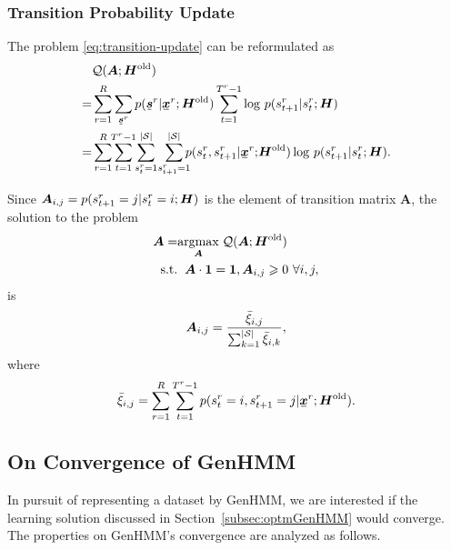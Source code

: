 \subsubsection{Transition Probability Update}
The problem \eqref{eq:transition-update} can be reformulated as
\begin{align}
  &\Qq(\bm{A}; \bm{H}^{\mathrm{old}})\nonumber \\
  =& \sum_{r=1}^{R} \sum_{\ubmr{s}{r}}{p(\ubmr{s}{r}| \ubmr{x}{r}; \bm{H}^{\mathrm{old}})} \sum_{t=1}^{T^{r}-1}\log\,p(\smtr{s}{t+1}{r}|\smtr{s}{t}{r}; \bm{H}) \nonumber \\
  =& \sum_{r=1}^{R} \hspace{-0.1cm}\sum_{t=1}^{T^{r}-1}\hspace{-0.1cm} \sum_{\smtr{s}{t}{r}=1}^{|\Ss|}\hspace{-0.05cm}\sum_{\smtr{s}{t+1}{r}=1}^{|\Ss|}\hspace{-0.2cm}{p(\smtr{s}{t}{r}, \smtr{s}{t+1}{r}| \ubmr{x}{r};\hspace{-0.05cm} \bm{H}^{\mathrm{old}})} \log\,p(\smtr{s}{t+1}{r}|\smtr{s}{t}{r}; \bm{H}).
\end{align}

Since $\bm{A}_{i, j}  = p(\smtr{s}{t+1}{r}=j|\smtr{s}{t}{r}=i; \bm{H})$ is the element of transition matrix $\bm{A}$, the solution to the problem
\begin{align}\label{eq:update-transition-prob}
  \bm{A} = &\uargmax{\bm{A}} \Qq(\bm{A}; \bm{H}^{\mathrm{old}}) \nonumber \\
  \mathrm{s.t.} &\hspace{0.2cm} \bm{A} \cdot \bm{1} = \bm{1}, \bm{A}_{i,j} \geq 0 \,\, \forall i,j,
\end{align}
is
\begin{equation}
  \bm{A}_{i,j} = \frac{\bar{\xi}_{i,j}}{\sum_{k = 1}^{|\Ss|} \bar{\xi}_{i,k}},
\end{equation}
where
\begin{equation}\label{eq:update-transition-solt}
  \bar{\xi}_{i,j} = \sum_{r= 1}^{R} \sum_{t= 1}^{T^{r}-1}{p(\smtr{s}{t}{r}=i, \smtr{s}{t+1}{r}=j| \ubmr{x}{r}; \bm{H}^{\mathrm{old}})}.
\end{equation}
\subsection{On Convergence of GenHMM}
In pursuit of representing a dataset by GenHMM,  we are interested if the learning solution discussed in Section~\ref{subsec:optmGenHMM} would converge. The properties on GenHMM's convergence are analyzed as follows.

